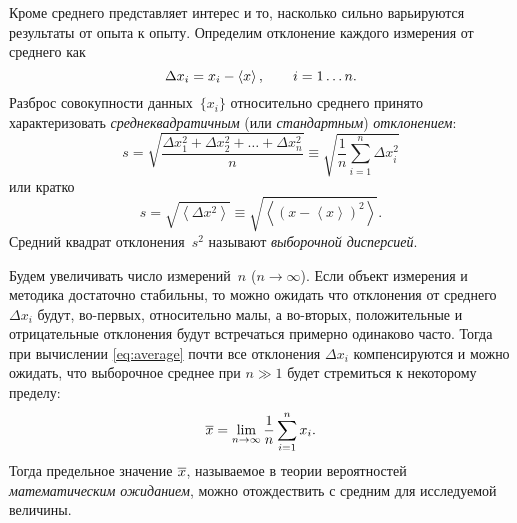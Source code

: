 

Кроме среднего представляет интерес и то, насколько сильно варьируются
результаты от опыта к опыту. Определим отклонение каждого измерения от среднего как
\[
    \Delta x_{i} = x_{i} - \left<x\right>,\qquad i=1\ldots n.
\]
Разброс совокупности данных~$\{x_i\}$ относительно среднего принято характеризовать
\emph{среднеквадратичным} (или \emph{стандартным}) \emph{отклонением}:
\begin{equation}
    s = \sqrt{\frac{\Delta x_{1}^{2} + \Delta x_{2}^{2} +
              \ldots + \Delta x_{n}^{2}}{n}}
        \equiv \sqrt{\frac{1}{n} \sum\limits_{i=1}^{n} \Delta x_{i}^{2}}
\label{eq:sigma}
\end{equation}
или кратко
\begin{equation}
    s = \sqrt{\left<\Delta x^{2}\right>} \equiv 
        \sqrt{\left<(x - \left<x\right>)^{2}\right>}.
    \label{eq:sigma_s}
\end{equation}
Средний квадрат отклонения~$s^{2}$ называют \emph{выборочной дисперсией}.

%

Будем увеличивать число измерений~$n$ ($n\to \infty$). Если объект измерения и методика
достаточно стабильны, то можно ожидать что отклонения от среднего~$\Delta x_i$ будут, во-первых,
относительно малы, а во-вторых, положительные и отрицательные отклонения будут
встречаться примерно одинаково часто. Тогда при вычислении \eqref{eq:average}
почти все отклонения $\Delta x_i$ компенсируются и можно ожидать,
что выборочное среднее при $n\gg 1$ будет стремиться к некоторому пределу:
\[
    \overline{x} = \lim_{n\to\infty}\frac{1}{n} \sum_{i=1}^{n}x_{i}.
\]
Тогда предельное значение $\overline{x}$, называемое в теории вероятностей \emph{математическим ожиданием}, 
можно отождествить с  средним для исследуемой величины.

